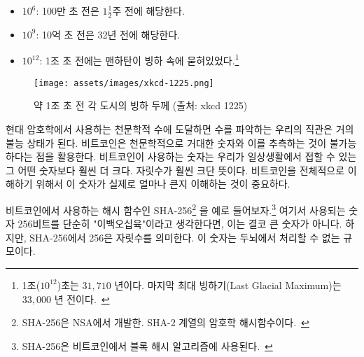 \begin{itemize}
	\item $10^6$: 100만 초 전은 $1 \frac{1}{2}$주 전에 해당한다.
	\item $10^9$: 10억 초 전은 32년 전에 해당한다.
	\item $10^{12}$: 1조 초 전에는 맨하탄이 빙하 속에 묻혀있었다.\footnote{1조($10^{12}$)초는 $31,710$ 년이다. 마지막 최대 빙하기(Last  Glacial Maximum)는 $33,000$ 년 전이다.~\cite{wiki:LGM}}
\end{itemize}

\begin{figure}
	\texttt{[image: assets/images/xkcd-1225.png]}
	\caption{약 1조 초 전 각 도시의 빙하 두께 (출처: xkcd 1225)}
	\label{fig:xkcd-1225}
\end{figure}

\begin{comment}
	As soon as we enter the beyond-astronomical realm of modern
	cryptography, our intuition fails catastrophically. Bitcoin is built
	around large numbers and the virtual impossibility of guessing them.
	These numbers are way, way larger than anything we might encounter in
	day-to-day life. Many orders of magnitude larger. Understanding how
	large these numbers truly are is essential to understanding Bitcoin as a
	whole.
\end{comment}
현대 암호학에서 사용하는 천문학적 수에 도달하면 수를 파악하는 우리의 직관은 거의 불능 상태가 된다.
비트코인은 천문학적으로 거대한 숫자와 이를 추측하는 것이 불가능하다는 점을 활용한다.
비트코인이 사용하는 숫자는 우리가 일상생활에서 접할 수 있는 그 어떤 숫자보다 훨씬 더 크다. 자릿수가 훨씬 크단 뜻이다.
비트코인을 전체적으로 이해하기 위해서 이 숫자가 실제로 얼마나 큰지 이해하는 것이 중요하다.

\begin{comment}
	Let's take SHA-256\footnote{SHA-256 is part of the SHA-2 family of cryptographic
		hash functions developed by the NSA.~\cite{wiki:sha2}}, one of the hash
	functions\footnote{Bitcoin uses SHA-256 in its block hashing
		algorithm.~\cite{btcwiki:block-hashing}} used in Bitcoin, as a concrete example.
	It is only natural to think about 256 bits as \enquote{two hundred fifty-six,} which
	isn't a large number at all. However, the number in SHA-256 is talking about
	orders of magnitude --- something our brains are not well-equipped to deal with.
\end{comment}
비트코인에서 사용하는 해시 함수인 SHA-256\footnote{SHA-256은 NSA에서 개발한. SHA-2 계열의 암호학 해시함수이다.~\cite{wiki:sha2}}
을 예로 들어보자.\footnote{SHA-256은 비트코인에서 블록 해시 알고리즘에 사용된다.~\cite{btcwiki:block-hashing}} 
여기서 사용되는 숫자 256비트를 단순히 "이백오십육"이라고 생각한다면, 이는 결코 큰 숫자가 아니다.
하지만, SHA-256에서 256은 자릿수를 의미한다. 이 숫자는 두뇌에서 처리할 수 없는 규모이다.

